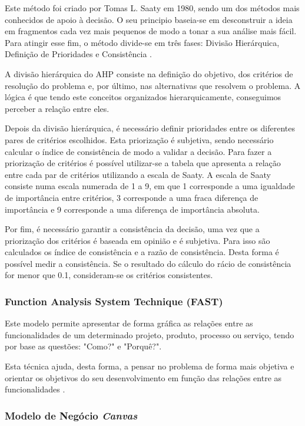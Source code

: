 Este método foi criado por Tomas L. Saaty em 1980, sendo um dos métodos mais conhecidos de apoio à decisão. O seu principio baseia-se em desconstruir a ideia em fragmentos cada vez mais pequenos de modo a tonar a sua análise mais fácil. Para atingir esse fim, o método divide-se em três fases: Divisão Hierárquica, Definição de Prioridades e Consistência \cite{ahp}.

A divisão hierárquica do AHP consiste na definição do objetivo, dos critérios de resolução do problema e, por último, nas alternativas que resolvem o problema. A lógica é que tendo este conceitos organizados hierarquicamente, conseguimos perceber a relação entre eles.

Depois da divisão hierárquica, é necessário definir prioridades entre os diferentes pares de critérios escolhidos. Esta priorização é subjetiva, sendo necessário calcular o índice de consistência de modo a validar a decisão. Para fazer a priorização de critérios é possível utilizar-se a tabela que apresenta a relação entre cada par de critérios utilizando a escala de Saaty. A escala de Saaty consiste numa escala numerada de 1 a 9, em que 1 corresponde a uma igualdade de importância entre critérios, 3 corresponde a uma fraca diferença de importância e 9 corresponde a uma diferença de importância absoluta. 


Por fim, é necessário garantir a consistência da decisão, uma vez que a priorização dos critérios é baseada em opinião e é subjetiva. Para isso são calculados os
índice de consistência e a razão de consistência. Desta forma é possível medir a consistência. Se o resultado do cálculo do rácio de consistência for menor que 0.1, consideram-se os critérios consistentes.

\subsubsection{Function Analysis System Technique (FAST) \label{sym:FAST}}

Este modelo permite apresentar de forma gráfica as relações entre as funcionalidades de um determinado projeto, produto, processo ou serviço, tendo por base as questões: "Como?" e "Porquê?"\cite{fast}.

Esta técnica ajuda, desta forma, a pensar no problema de forma mais objetiva e orientar os objetivos do seu desenvolvimento em função das relações entre as funcionalidades \cite{fast}.


\subsubsection{Modelo de Negócio \emph{Canvas}}

